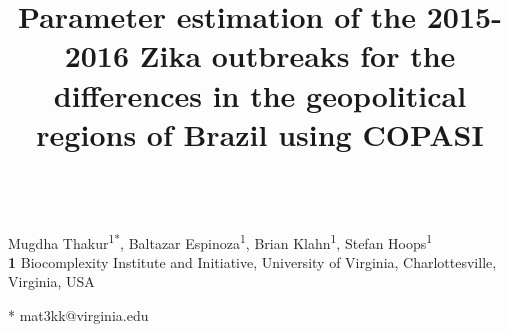 \documentclass[10pt,letterpaper]{article}
\title{Parameter estimation of the 2015-2016 Zika outbreaks for the differences in the geopolitical regions of Brazil using COPASI}
\author{}
\date{}
\begin{document}
\vspace*{0.2in}

\begin{flushleft}
{\Large
\textbf{} %
}
\newline
\\
Mugdha Thakur\textsuperscript{1*},
Baltazar Espinoza\textsuperscript{1},
Brian Klahn\textsuperscript{1},
Stefan Hoops\textsuperscript{1}
\\
\bigskip
\textbf{1} Biocomplexity Institute and Initiative, University of Virginia, Charlottesville, Virginia, USA
\\
\bigskip

% 
%





* mat3kk@virginia.edu

\end{flushleft}
\end{document}
